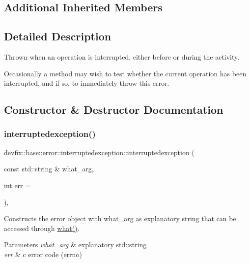 \subsection*{Additional Inherited Members}


\subsection{Detailed Description}
Thrown when an operation is interrupted, either before or during the activity. 

Occasionally a method may wish to test whether the current operation has been interrupted, and if so, to immediately throw this error. 

\subsection{Constructor \& Destructor Documentation}
\mbox{\label{structdevfix_1_1base_1_1error_1_1interruptedexception_ab89281cb08ca7481da32bde8da8e7a00}} 
\subsubsection{\texorpdfstring{interruptedexception()}{interruptedexception()}\hspace{0.1cm}{\footnotesize\ttfamily [1/2]}}
{\footnotesize\ttfamily devfix\+::base\+::error\+::interruptedexception\+::interruptedexception (\begin{DoxyParamCaption}\item[{const std\+::string \&}]{what\+\_\+arg,  }\item[{int}]{err = {} }\end{DoxyParamCaption})\hspace{0.3cm}{\ttfamily [inline]}, {\ttfamily [explicit]}}

Constructs the error object with what\+\_\+arg as explanatory string that can be accessed through \hyperlink{structdevfix_1_1base_1_1error_1_1baseexception_a16327152a55d65b1e537825231fbd452}{what()}. 
\begin{DoxyParams}{Parameters}
{\em what\+\_\+arg} & explanatory std\+::string \\
\hline
{\em err} & c error code (errno) \\
\hline
\end{DoxyParams}
\mbox{\label{structdevfix_1_1base_1_1error_1_1interruptedexception_ac84d255100c72753ea35f8e7007413c1}} 
